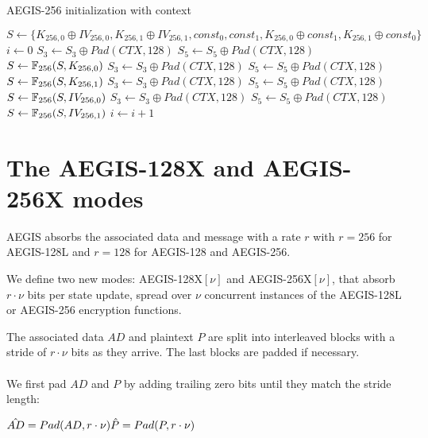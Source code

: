 \documentclass[envcountsame,runningheads,notitlepage]{llncs}
\begin{document}
\begin{algorithm}
  \caption{AEGIS-256 initialization with context}
  \label{aegis-256 initialization with context}
  \begin{algorithmic}
    \State $S \gets \{ K_{256,0} \oplus IV_{256,0}, K_{256,1} \oplus IV_{256,1}, const_0, const_1, K_{256,0} \oplus const_1, K_{256,1} \oplus const_0 \}$
    \State $i \gets 0$
    \State $S_3 \gets S_3 \oplus Pad(CTX, 128)$
    \State $S_5 \gets S_5 \oplus Pad(CTX, 128)$
    \State $S \gets \mathbb{F}_{256}(S, K_{256,0})$
    \State $S_3 \gets S_3 \oplus Pad(CTX, 128)$
    \State $S_5 \gets S_5 \oplus Pad(CTX, 128)$
    \State $S \gets \mathbb{F}_{256}(S, K_{256,1})$
    \State $S_3 \gets S_3 \oplus Pad(CTX, 128)$
    \State $S_5 \gets S_5 \oplus Pad(CTX, 128)$
    \State $S \gets \mathbb{F}_{256}(S, IV_{256,0})$
    \State $S_3 \gets S_3 \oplus Pad(CTX, 128)$
    \State $S_5 \gets S_5 \oplus Pad(CTX, 128)$
    \State $S \gets \mathbb{F}_{256}(S, IV_{256,1})$
    \State $i \gets i+1$
    \EndWhile
    \EndFunction
  \end{algorithmic}
\end{algorithm}

\section{The AEGIS-128X and AEGIS-256X modes}
\label{sec:parallel processing}

AEGIS absorbs the associated data and message with a rate $r$ with $r=256$ for AEGIS-128L and $r=128$ for AEGIS-128 and AEGIS-256.

We define two new modes: AEGIS-128X$[\nu]$ and AEGIS-256X$[\nu]$, that absorb $r \cdot \nu$ bits per state update, spread over $\nu$ concurrent instances of the AEGIS-128L or AEGIS-256 encryption functions.

The associated data $AD$ and plaintext $P$ are split into interleaved blocks with a stride of $r \cdot \nu$ bits as they arrive. The last blocks are padded if necessary.

\paragraph{}

We first pad $AD$ and $P$ by adding trailing zero bits until they match the stride length:

\begin{math}
  \\
  \hat{AD} = Pad(AD, r \cdot \nu) \\
  \hat{P} = Pad(P, r \cdot \nu)
\end{math}
\end{document}
